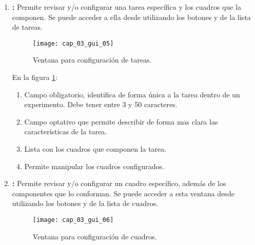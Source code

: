 \documentclass[\main/Main.tex]{subfiles}
\begin{document}
\begin{enumerate}
				\item \textbf{:} Permite revisar y/o configurar una tarea específica y los cuadros que la componen. Se puede acceder a ella desde  utilizando los botones  y  de la lista de tareas.
				\begin{figure}[H]
					\centering
					\texttt{[image: cap\_03\_gui\_05]}
					\caption{Ventana para configuración de tareas.}
					\label{fig:03_gui_tes}
				\end{figure}

				\vspace{-5mm}

				En la figura \ref{fig:03_gui_tes}:
				\begin{enumerate}[(1)]\setlength\itemsep{-0.5em}
					\item Campo obligatorio, identifica de forma única a la tarea dentro de un experimento. Debe tener entre 3 y 50 caracteres.
					\item Campo optativo que permite describir de forma mas clara las características de la tarea.
					\item Lista con los cuadros que componen la tarea.
					\item Permite manipular los cuadros configurados.
				\end{enumerate}

				\item \textbf{:} Permite revisar y/o configurar un cuadro específico, además de los componentes que lo conforman. Se puede acceder a esta ventana desde  utilizando los botones  y  de la lista de cuadros. 
				\begin{figure}[H]
					\centering
					\texttt{[image: cap\_03\_gui\_06]}
					\caption{Ventana para configuración de cuadros.}
					\label{fig:03_gui_fra}
				\end{figure}

				\vspace{-5mm}


\end{enumerate}
\end{document}
